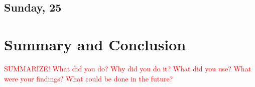 \section{Sunday, \SI{25}{\dec}}

% 
% 

% 


\chapter{Summary and Conclusion}
\textcolor{red}{SUMMARIZE! What did you do? Why did you do it? What did you use? What were your findings? What could be done in the future?}

